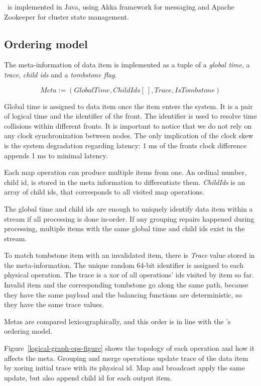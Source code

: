 \label{fs-impl}

\FlameStream\ is implemented in Java, using Akka framework for messaging and Apache Zookeeper for cluster state management.

\subsection{Ordering model}
The meta-information of data item is implemented as a tuple of a {\it global time}, a {\it trace}, {\it child ids} and a {\it tombstone flag}.

\[Meta := (GlobalTime, ChildIds[\:], Trace, IsTombstone)\]

Global time is assigned to data item once the item enters the system. It is a pair of logical time and the identifier of the front. The identifier is used to resolve time collisions within different fronts. It is important to notice that we do not rely on any clock synchronization between nodes. The only implication of the clock skew is the system degradation regarding latency: 1 ms of the fronts clock difference appends 1 ms to minimal latency.

Each map operation can produce multiple items from one.  An ordinal number, child id, is stored in the meta information to differentiate them. {\it ChildIds} is an array of child ids, that corresponds to all visited map operations.

The global time and child ids are enough to uniquely identify data item within a stream if all processing is done in-order. If any grouping repairs happened during processing, multiple items with the same global time and child ids exist in the stream. 

To match tombstone item with an invalidated item, there is {\it Trace} value stored in the meta-information. The unique random 64-bit identifier is assigned to each physical operation. The trace is a xor of all operations' ids visited by item so far. Invalid item and the corresponding tombstone go along the same path, because they have the same payload and the balancing functions are deterministic, so they have the same trace values.

Metas are compared lexicographically, and this order is in line with the \FlameStream's ordering model.

Figure~\ref{logical-graph-ops-figure} shows the topology of each operation and how it affects the meta. Grouping and merge operations update trace of the data item by xoring initial trace with its physical id. Map and broadcast apply the same update, but also append child id for each output item.

